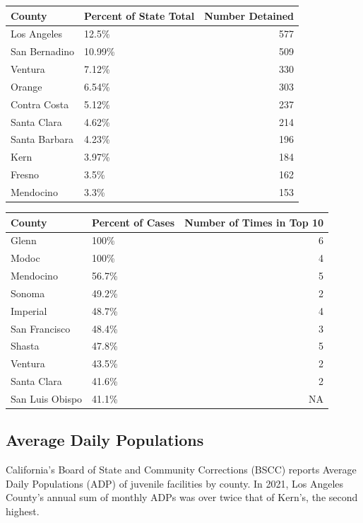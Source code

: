 \documentclass[
]{article}
\begin{document}
\begin{table}

\begin{tabular}[t]{l|l|r}
\hline
County & Percent of State Total & Number Detained\\
\hline
Los Angeles & 12.5\% & 577\\
\hline
San Bernadino & 10.99\% & 509\\
\hline
Ventura & 7.12\% & 330\\
\hline
Orange & 6.54\% & 303\\
\hline
Contra Costa & 5.12\% & 237\\
\hline
Santa Clara & 4.62\% & 214\\
\hline
Santa Barbara & 4.23\% & 196\\
\hline
Kern & 3.97\% & 184\\
\hline
Fresno & 3.5\% & 162\\
\hline
Mendocino & 3.3\% & 153\\
\hline
\end{tabular}
\begin{tabular}[t]{l|l|r}
\hline
County & Percent of Cases & Number of Times in Top 10\\
\hline
Glenn & 100\% & 6\\
\hline
Modoc & 100\% & 4\\
\hline
Mendocino & 56.7\% & 5\\
\hline
Sonoma & 49.2\% & 2\\
\hline
Imperial & 48.7\% & 4\\
\hline
San Francisco & 48.4\% & 3\\
\hline
Shasta & 47.8\% & 5\\
\hline
Ventura & 43.5\% & 2\\
\hline
Santa Clara & 41.6\% & 2\\
\hline
San Luis Obispo & 41.1\% & NA\\
\hline
\end{tabular}
\end{table}

\hypertarget{average-daily-populations}{%
\subsection{Average Daily Populations}\label{average-daily-populations}}

California's Board of State and Community Corrections (BSCC) reports
Average Daily Populations (ADP) of juvenile facilities by county. In
2021, Los Angeles County's annual sum of monthly ADPs was over twice
that of Kern's, the second highest.
\end{document}
